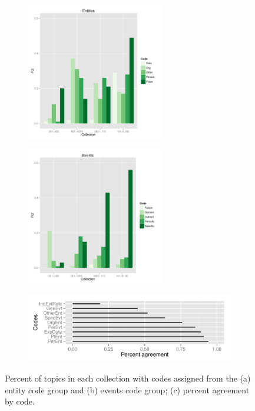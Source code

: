 \documentclass[runningheads,a4paper]{llncs}
\begin{document}
\begin{figure}
\centering
\begin{subfigure}{.5\textwidth}
  \centering
\includegraphics[width=6cm]{plots/topic-groups-ent.pdf}
\end{subfigure}%
\begin{subfigure}{.5\textwidth}
  \centering
\includegraphics[width=6cm]{plots/topic-groups-evt.pdf}
\end{subfigure}
\begin{subfigure}{\textwidth}
\includegraphics[width=11cm]{plots/coder-agreement.pdf}
\end{subfigure}
\caption{Percent of topics in each collection with codes assigned from the (a) entity code group and (b) events code group; (c) percent agreement by code.}
\label{fig.codedist}
\end{figure}
\end{document}
